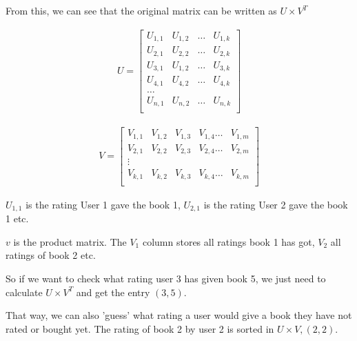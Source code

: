 \documentclass[11pt]{article}
\begin{document}
From this, we can see that the original matrix can be written as $U \times V^T$

\begin{minipage}{0.45\textwidth}
    \begin{align*}
        U =
        \begin{bmatrix}
            U_{1,1} & U_{1,2} & \hdots & U_{1,k} \\
            U_{2,1} & U_{2,2} & \hdots & U_{2,k} \\
            U_{3,1} & U_{1,2} & \hdots & U_{3,k} \\
            U_{4,1} & U_{4,2} & \hdots & U_{4,k} \\
            \hdots                               \\
            U_{n,1} & U_{n,2} & \hdots & U_{n,k} \\
        \end{bmatrix}
    \end{align*}
\end{minipage} \hfill
\begin{minipage}{0.45\textwidth}
    \begin{align*}
        V =
        \begin{bmatrix}
            V_{1,1} & V_{1,2} & V_{1,3} & V_{1,4} \hdots & V_{1,m} \\
            V_{2,1} & V_{2,2} & V_{2,3} & V_{2,4} \hdots & V_{2,m} \\
            \vdots                                                 \\
            V_{k,1} & V_{k,2} & V_{k,3} & V_{k,4} \hdots & V_{k,m} \\
        \end{bmatrix}
    \end{align*}
\end{minipage}

\vspace{10px}

$U_{1,1}$ is the rating User 1 gave the book 1,  $U_{2,1}$ is the rating User 2 gave the book 1 etc.

$v$ is the product matrix. The $V_1$ column stores all ratings book 1 has got, $V_2$ all ratings of book 2 etc.

\vspace{10px}

So if we want to check what rating user 3 has given book 5, we just need to calculate $U \times V^T$ and get the entry $(3,5)$.

That way, we can also 'guess' what rating a user would give a book they have not rated or bought yet. The rating of book 2 by user 2 is sorted in $U \times V, (2,2)$.
\end{document}

